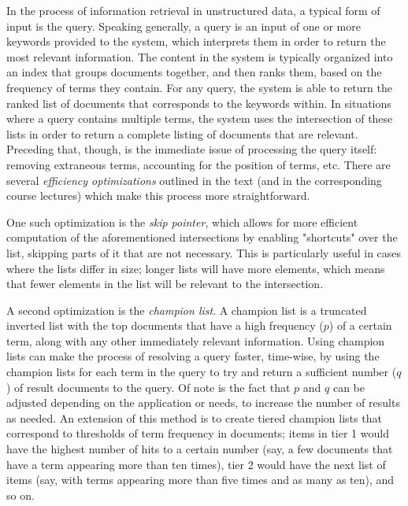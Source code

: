 \documentclass[11pt]{article}
\begin{document}
  
  \graphicspath{{./images/}}
  In the process of information retrieval in unstructured data, a typical form of input is the query.
  Speaking generally, a query is an input of one or more keywords provided to the system, which interprets them in order to return the most relevant information.
  The content in the system is typically organized into an index that groups documents together, and then ranks them, based on the frequency of terms they contain.
  For any query, the system is able to return the ranked list of documents that corresponds to the keywords within.
  In situations where a query contains multiple terms, the system uses the intersection of these lists in order to return a complete listing of documents that are relevant.
  Preceding that, though, is the immediate issue of processing the query itself: removing extraneous terms, accounting for the position of terms, etc.
  There are several \textit{efficiency optimizations} outlined in the text (and in the corresponding course lectures) which make this process more straightforward.
  
  One such optimization is the \textit{skip pointer}, which allows for more efficient computation of the aforementioned intersections by enabling "shortcuts" over the list, skipping parts of it that are not necessary.
  This is particularly useful in cases where the lists differ in size; longer lists will have more elements, which means that fewer elements in the list will be relevant to the intersection.
  
  A second optimization is the \textit{champion list}.
  A champion list is a truncated inverted list with the top documents that have a high frequency ($p$) of a certain term, along with any other immediately relevant information.
  Using champion lists can make the process of resolving a query faster, time-wise, by using the champion lists for each term in the query to try and return a sufficient number ($q$) of result documents to the query.
  Of note is the fact that $p$ and $q$ can be adjusted depending on the application or needs, to increase the number of results as needed.
  An extension of this method is to create tiered champion lists that correspond to thresholds of term frequency in documents; items in tier 1 would have the highest number of hits to a certain number (say, a few documents that have a term appearing more than ten times), tier 2 would have the next list of items (say, with terms appearing more than five times and as many as ten), and so on.
  
\end{document}
